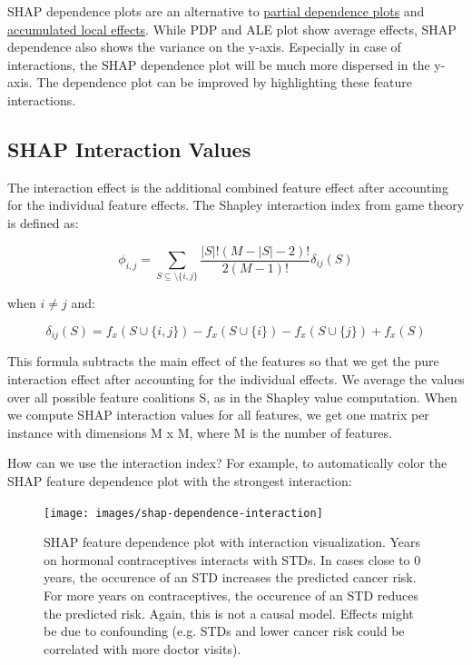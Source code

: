 \documentclass[12pt,]{krantz}
\begin{document}
SHAP dependence plots are an alternative to
\protect\hyperlink{pdp}{partial dependence plots} and
\protect\hyperlink{ale}{accumulated local effects}. While PDP and ALE
plot show average effects, SHAP dependence also shows the variance on
the y-axis. Especially in case of interactions, the SHAP dependence plot
will be much more dispersed in the y-axis. The dependence plot can be
improved by highlighting these feature interactions.

\subsection{SHAP Interaction Values}\label{shap-interaction-values}

The interaction effect is the additional combined feature effect after
accounting for the individual feature effects. The Shapley interaction
index from game theory is defined as:

\[\phi_{i,j}=\sum_{S\subseteq\setminus\{i,j\}}\frac{|S|!(M-|S|-2)!}{2(M-1)!}\delta_{ij}(S)\]

when \(i\neq{}j\) and:

\[\delta_{ij}(S)=f_x(S\cup\{i,j\})-f_x(S\cup\{i\})-f_x(S\cup\{j\})+f_x(S)\]

This formula subtracts the main effect of the features so that we get
the pure interaction effect after accounting for the individual effects.
We average the values over all possible feature coalitions S, as in the
Shapley value computation. When we compute SHAP interaction values for
all features, we get one matrix per instance with dimensions M x M,
where M is the number of features.

How can we use the interaction index? For example, to automatically
color the SHAP feature dependence plot with the strongest interaction:

\begin{figure}

{\centering \texttt{[image: images/shap-dependence-interaction]} 

}

\caption{SHAP feature dependence plot with interaction visualization. Years on hormonal contraceptives interacts with STDs. In cases close to 0 years, the occurence of an STD increases the predicted cancer risk. For more years on contraceptives, the occurence of an STD reduces the predicted risk. Again, this is not a causal model. Effects might be due to confounding (e.g. STDs and lower cancer risk could be correlated with more doctor visits).}\label{fig:unnamed-chunk-48}
\end{figure}
\end{document}
